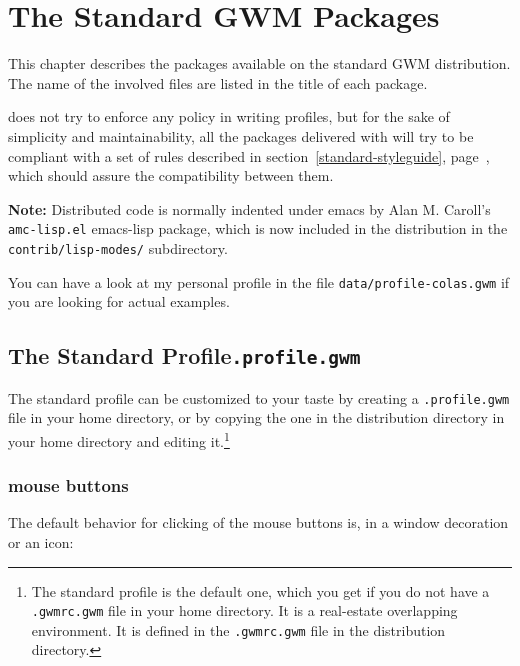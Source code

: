 \chapter{The Standard GWM Packages}

\sloppy

This chapter describes the {\WOOL} packages available on the standard GWM
distribution. The name of the involved files are listed in the title of each
package.

{\GWM} does not try to enforce any policy in writing profiles, but for the
sake of simplicity and maintainability, all the {\WOOL} packages delivered
with {\GWM} will try to be compliant with a set of rules described in
section~\ref{standard-styleguide}, page~\pageref{standard-styleguide}, which
should assure the compatibility between them.

{\bf Note:} Distributed code is normally indented under emacs by Alan M.
Caroll's \verb|amc-lisp.el| emacs-lisp package, which is now included in the
{\GWM} distribution in the \verb|contrib/lisp-modes/| subdirectory.

You can have a look at my personal profile in the file
\verb|data/profile-colas.gwm| if you are looking for actual examples.

\section{The Standard Profile\hfill{\tt .profile.gwm}}
\label{standard-profile}

The standard profile can be customized to your taste by creating a
\verb".profile.gwm" file in your home directory, or by copying the one in
the {\GWM} distribution directory in your home directory and editing 
it.\footnote{The standard profile is the default one, which you get if you do
not have a \verb".gwmrc.gwm" file in your home directory. It is a
real-estate overlapping environment. It is defined in the \verb".gwmrc.gwm"
file in the {\GWM} distribution directory.}

\subsection{mouse buttons}

The default behavior for clicking of the mouse buttons is, in a window
decoration or an icon:

